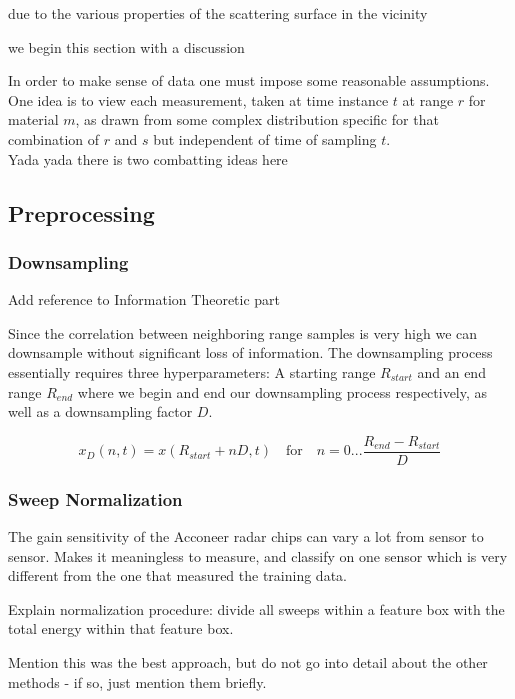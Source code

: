 \documentclass[a4paper, 12pt]{article}
\begin{document}


due to the various properties of the scattering surface in the vicinity 

we begin this section with a discussion 



In order to make sense of data one must impose some reasonable assumptions. 
\\ 
One idea is to view each measurement, taken at time instance $t$ at range $r$ for material $m$, as drawn from some 
complex distribution specific for that combination of $r$ and $s$ but independent of time of sampling $t$. 
\\
Yada yada there is two combatting ideas here

\subsection{Preprocessing}

\subsubsection{Downsampling}
Add reference to Information Theoretic part

Since the correlation between neighboring range samples is very high we can downsample without significant loss of information. The downsampling process essentially requires three hyperparameters: A starting range $R_{start}$ and an end range $R_{end}$ where we begin and end our downsampling process respectively, as well as a downsampling factor $D$.

\begin{equation}
	x_D(n, t) = x(R_{start} + nD, t) \quad \text{for}\quad n=0...\frac{R_{end}-R_{start}}{D}
\end{equation}

\subsubsection{Sweep Normalization}
The gain sensitivity of the Acconeer radar chips can vary a lot from sensor to sensor. Makes it meaningless to measure, and classify on one sensor which is very different from the one that measured the training data. 

Explain normalization procedure: divide all sweeps within a feature box with the total energy within that feature box. 

Mention this was the best approach, but do not go into detail about the other methods - if so, just mention them briefly.
\end{document}
